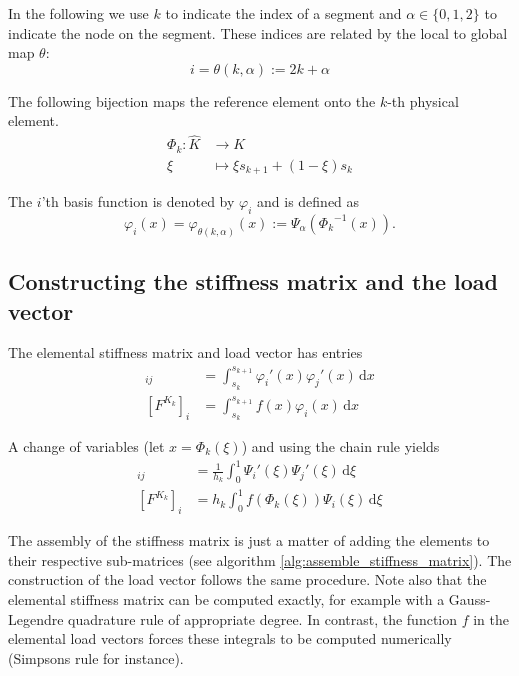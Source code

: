 In the following we use \( k \) to indicate the index
of a segment and \( \alpha \in \{  0, 1, 2  \} \) to indicate
the node on the segment. These indices are related by the
local to global map \( \theta \):
\begin{equation}
  \label{eq:loc2glob}
  i = \theta(k, \alpha) := 2k + \alpha    
\end{equation}

The following bijection maps the reference element onto
the \( k \)-th physical element.
\begin{equation} \label{eq:ref2phys}
\begin{split}
  \Phi_k : \hat{K} &\longrightarrow  K \\
  \xi & \longmapsto \xi s_{k+1} + (1-\xi) s_{k}
\end{split}
\end{equation}

The \( i \)'th basis function is denoted by \( \varphi_i \)
and is defined as
\begin{equation}
  \varphi_i(x) = \varphi_{\theta(k, \alpha)} (x) := \Psi_{\alpha}({{\Phi_k}^{-1}(x) }).
\end{equation}

\subsection{Constructing the stiffness matrix and the load vector}

The elemental stiffness matrix and load vector has entries
\begin{align}
  [A^{K_k}]_{ij}
    &=  \int_{s_k}^{s_{k+1}} \varphi_i'(x) \varphi_j'(x) \,\mathrm{d}x\\
  [F^{K_k}]_i
    &= \int_{s_k}^{s_{k+1}} f\left(x\right) \varphi_i\left(x\right) \,\mathrm{d}x
\end{align}

A change of variables (let \( x = \Phi_k(\xi) \)) and using the chain rule yields
\begin{align}
  [A^{K_k}]_{ij}
    &= \frac{1}{h_k} \int_{0}^{1} \Psi_i'(\xi)\Psi_j'(\xi) \,\mathrm{d}\xi \\
  [F^{K_k}]_i
    &= h_k \int_{0}^{1} f\left(\Phi_k\left(\xi\right)\right) \Psi_i\left(\xi\right) \,\mathrm{d}\xi
\end{align}

The assembly of the stiffness matrix is just a matter of
adding the elements to their respective sub-matrices (see algorithm \ref{alg:assemble_stiffness_matrix}).
The construction of the load vector follows the same procedure.
Note also that the elemental stiffness matrix
can be computed exactly, for example with a Gauss-Legendre quadrature rule of appropriate
degree. In contrast, the function \( f \) in the elemental load vectors
forces these integrals to be computed numerically (Simpsons rule for instance).

